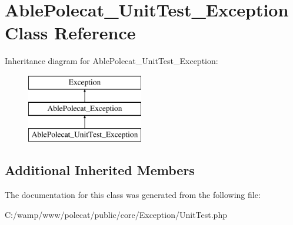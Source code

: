 \hypertarget{class_able_polecat___unit_test___exception}{}\section{Able\+Polecat\+\_\+\+Unit\+Test\+\_\+\+Exception Class Reference}
\label{class_able_polecat___unit_test___exception}
Inheritance diagram for Able\+Polecat\+\_\+\+Unit\+Test\+\_\+\+Exception\+:\begin{figure}[H]
\begin{center}
\leavevmode
\includegraphics[height=3.000000cm]{class_able_polecat___unit_test___exception}
\end{center}
\end{figure}
\subsection*{Additional Inherited Members}


The documentation for this class was generated from the following file\+:\begin{DoxyCompactItemize}
\item 
C\+:/wamp/www/polecat/public/core/\+Exception/Unit\+Test.\+php\end{DoxyCompactItemize}
